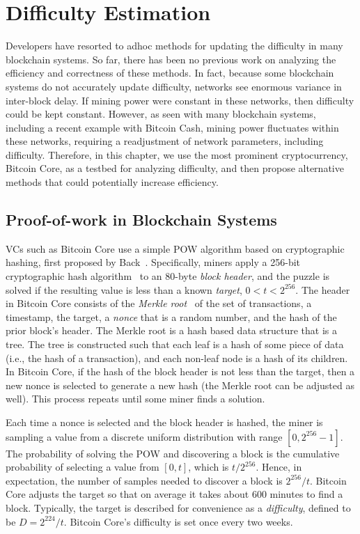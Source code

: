 \chapter{Difficulty Estimation}
\label{difficulty-estimation}

Developers have resorted to adhoc methods for updating the difficulty in many blockchain systems. So far, there has been no previous work on analyzing the efficiency and correctness of these methods. In fact, because some blockchain systems do not accurately update difficulty, networks see enormous variance in inter-block delay. If mining power were constant in these networks, then difficulty could be kept constant. However, as seen with many blockchain systems, including a recent example with Bitcoin Cash, mining power fluctuates within these networks, requiring a readjustment of network parameters, including difficulty. Therefore, in this chapter, we use the most prominent cryptocurrency, Bitcoin Core, as a testbed for analyzing difficulty, and then propose alternative methods that could potentially increase efficiency. 

\section{Proof-of-work in Blockchain Systems}
VCs such as Bitcoin Core use a simple POW algorithm based on cryptographic
hashing, first proposed by Back~\cite{Back:2002}.
Specifically, miners apply a 256-bit cryptographic hash algorithm~\cite{hashcash} to
an 80-byte {\em block header}, and the puzzle is solved if the
resulting value is less than a known {\em target}, $0<t<2^{256}$. The
header in Bitcoin Core consists of the {\em Merkle root}~\cite{Merkle:1987} of the set of
transactions, a timestamp, the target, a {\em
  nonce} that is a random number, and the hash of the prior block's header. The Merkle root is a hash based data structure that is a tree. The tree is constructed such that each leaf is a hash of some piece of data (i.e., the hash of a transaction), and each non-leaf node is a hash of its children.
In Bitcoin Core, if the hash of the block header is not less than the target, then a new nonce is selected to generate a new hash (the Merkle root can be adjusted as well). This process repeats
until some miner finds a solution.
  
Each time a nonce is selected and the block
header is hashed, the miner is sampling a value from a discrete uniform
distribution with range $[0,2^{256}-1]$. The probability of solving the POW and
discovering a block is the cumulative probability of selecting a value
from $[0,t]$, which is $t/{2^{256}}$. Hence, in expectation, the
number of samples needed to discover a block is ${2^{256}/t}$. Bitcoin Core
adjusts the target so that on average it takes about 600 minutes to
find a block. Typically, the target is described for convenience as a
{\em difficulty}, defined to be $D=2^{224}/t$. Bitcoin Core's difficulty
is set once every two weeks.

